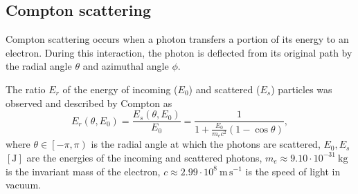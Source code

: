 \documentclass[a4paper,11pt,titlepage,twoside]{book}
\newcommand{\unit}[2]{$#1~\ensuremath{\mathrm{#2}}$}
\begin{document}

\subsection{Compton scattering}


Compton scattering occurs when a photon transfers a portion of its energy to an electron.
During this interaction, the photon is deflected from its original path by the radial angle $\theta$ and azimuthal angle $\phi$.

The ratio $E_r$ of the energy of incoming ($E_{0}$) and scattered ($E_{s}$) particles was observed and described by Compton as
\begin{equation}
  E_r\left(\theta, E_0\right) = \frac{E_s\left(\theta, E_0\right)}{E_{0}} = \frac{1}{1 + \frac{E_0}{m_ec^2}\left(1 - \cos\theta\right)},
\end{equation}
where $\theta \in \left[-\pi, \pi\right)$ is the radial angle at which the photons are scattered, $E_0, E_s$ $\left[\mathrm{J}\right]$ are the energies of the incoming and scattered photons, \unit{m_e \approx 9.10 \cdot 10^{-31}}{kg} is the invariant mass of the electron, \unit{c \approx 2.99 \cdot 10^{8}}{m\,s^{-1}} is the speed of light in vacuum.
\end{document}
